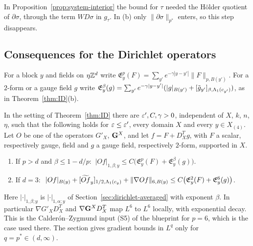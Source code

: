 In Proposition~\ref{prop:system-interior} the bound for $\tau$ needed the H\"older quotient of $\partial\sigma$, through the term $W D\sigma$ in $g_\tau$. In (b) only $\|\partial\sigma\|_{p^*}$ enters, so this step disappears.

\subsection{Consequences for the Dirichlet operators}

For a block $y$ and fields on $\eta\mathbb Z^d$ write $\mathfrak E^p_y(F)=\sum_{y'}e^{-\gamma|y-y'|}\|F\|_{p,B(y')}$. For a $2$-form or a gauge field $g$ write $\mathfrak E^{\beta}_y(g)=\sum_{y'}e^{-\gamma|y-y'|}(|g|_{B(y')}+[\tilde g_{y'}]_{\beta,\Lambda_1(c_{y'})})$, as in Theorem~\ref{thm:ID}(b).

\begin{corollary}\label{cor:lp-dirichlet}
In the setting of Theorem~\ref{thm:ID} there are $\varepsilon',C,\gamma>0$, independent of $X$, $k$, $n$, $\eta$, such that the following holds for $\varepsilon\le\varepsilon'$, every domain $X$ and every $y\in X_{(4)}$. Let $O$ be one of the operators $G'_X$, $\mathbf G^X$, and let $f=F+D^T_Xg$, with $F$ a scalar, respectively gauge, field and $g$ a gauge field, respectively $2$-form, supported in $X$.
\begin{enumerate}[label=(\alph*)]
\item If $p>d$ and $\beta\le1-d/p$: $\ |Of|_{1,\beta;y}\le C\big(\mathfrak E^p_y(F)+\mathfrak E^\beta_y(g)\big)$.
\item If $d=3$: $\ |Of|_{B(y)}+[\widetilde{Of}_y]_{1/2,\Lam_1(c_y)}+\|\nabla Of\|_{6,B(y)}\le C\big(\mathfrak E^2_y(F)+\mathfrak E^6_y(g)\big)$.
\end{enumerate}
Here $|\cdot|_{1,\beta;y}$ is $|\cdot|_{1,\alpha;y}$ of Section~\ref{sec:dirichlet-averaged} with exponent $\beta$. In particular $\nabla G'_XD^T_X$ and $\nabla\mathbf G^XD^T_X$ map $L^6$ to $L^6$ locally, with exponential decay. This is the Calder\'on--Zygmund input (S5) of the blueprint for $p=6$, which is the case used there. The section gives gradient bounds in $L^q$ only for $q=p^*\in(d,\infty)$.
\end{corollary}

